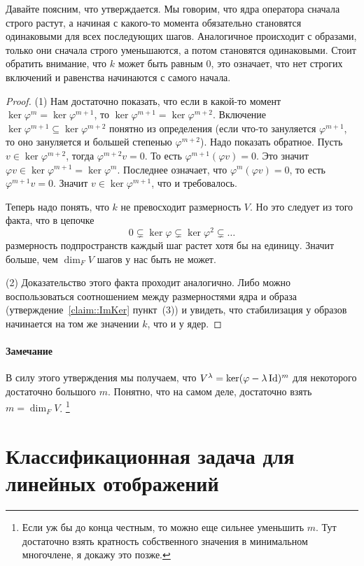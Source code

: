 Давайте поясним, что утверждается.
Мы говорим, что ядра оператора сначала строго растут, а начиная с какого-то момента обязательно становятся одинаковыми для всех последующих шагов.
Аналогичное происходит с образами, только они сначала строго уменьшаются, а потом становятся одинаковыми.
Стоит обратить внимание, что $k$ может быть равным $0$, это означает, что нет строгих включений и равенства начинаются с самого начала.

\begin{proof}

(1) Нам достаточно показать, что если в какой-то момент $\ker \varphi^m = \ker\varphi^{m+1}$, то $\ker \varphi^{m+1} = \ker\varphi^{m+2}$.
Включение $\ker \varphi^{m+1}\subseteq \ker \varphi^{m+2}$ понятно из определения (если что-то зануляется $\varphi^{m+1}$, то оно зануляется и большей степенью $\varphi^{m+2}$).
Надо показать обратное.
Пусть $v\in \ker \varphi^{m+2}$, тогда $\varphi^{m+2}v = 0$.
То есть $\varphi^{m+1}(\varphi v) = 0$.
Это значит $\varphi v \in \ker \varphi^{m+1} = \ker \varphi^m$.
Последнее означает, что $\varphi^m(\varphi v) = 0$, то есть $\varphi^{m+1} v = 0$.
Значит $v\in \ker \varphi^{m+1}$, что и требовалось.

Теперь надо понять, что $k$ не превосходит размерность $V$.
Но это следует из того факта, что в цепочке
\[
0\subsetneq \ker \varphi \subsetneq\ker\varphi^2\subsetneq \ldots
\]
размерность подпространств каждый шаг растет хотя бы на единицу.
Значит больше, чем $\dim_F V$ шагов у нас быть не может.

(2) Доказательство этого факта проходит аналогично.
Либо можно воспользоваться соотношением между размерностями ядра и образа (утверждение~\ref{claim::ImKer} пункт~(3)) и увидеть, что стабилизация у образов начинается на том же значении $k$, что и у ядер.
\end{proof}

\paragraph{Замечание}

В силу этого утверждения мы получаем, что $V^\lambda = \ker (\varphi - \lambda \operatorname{Id})^m$ для некоторого достаточно большого $m$.
Понятно, что на самом деле, достаточно взять $m = \dim_F V$.%
\footnote{Если уж бы до конца честным, то можно еще сильнее уменьшить $m$.
Тут достаточно взять кратность собственного значения в минимальном многочлене, я докажу это позже.}


\newpage
\section{Классификационная задача для линейных отображений}

